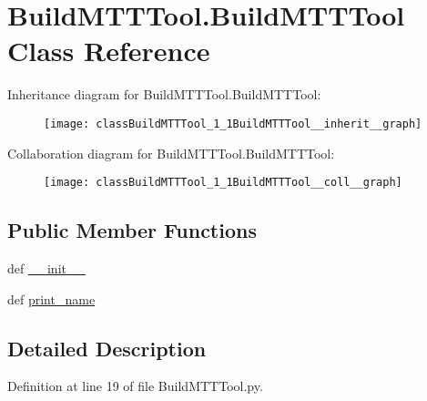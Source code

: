 \hypertarget{classBuildMTTTool_1_1BuildMTTTool}{\section{Build\-M\-T\-T\-Tool.\-Build\-M\-T\-T\-Tool Class Reference}
\label{classBuildMTTTool_1_1BuildMTTTool}
}


Inheritance diagram for Build\-M\-T\-T\-Tool.\-Build\-M\-T\-T\-Tool\-:\nopagebreak
\begin{figure}[H]
\begin{center}
\leavevmode
\texttt{[image: classBuildMTTTool\_1\_1BuildMTTTool\_\_inherit\_\_graph]}
\end{center}
\end{figure}


Collaboration diagram for Build\-M\-T\-T\-Tool.\-Build\-M\-T\-T\-Tool\-:\nopagebreak
\begin{figure}[H]
\begin{center}
\leavevmode
\texttt{[image: classBuildMTTTool\_1\_1BuildMTTTool\_\_coll\_\_graph]}
\end{center}
\end{figure}
\subsection*{Public Member Functions}
\begin{DoxyCompactItemize}
\item 
def \hyperlink{classBuildMTTTool_1_1BuildMTTTool_a5665b0ed7a6ef42181601533cdbe74be}{\-\_\-\-\_\-init\-\_\-\-\_\-}
\item 
def \hyperlink{classBuildMTTTool_1_1BuildMTTTool_afbb7e8957f4c8c43e2937489173de162}{print\-\_\-name}
\end{DoxyCompactItemize}


\subsection{Detailed Description}


Definition at line 19 of file Build\-M\-T\-T\-Tool.\-py.




